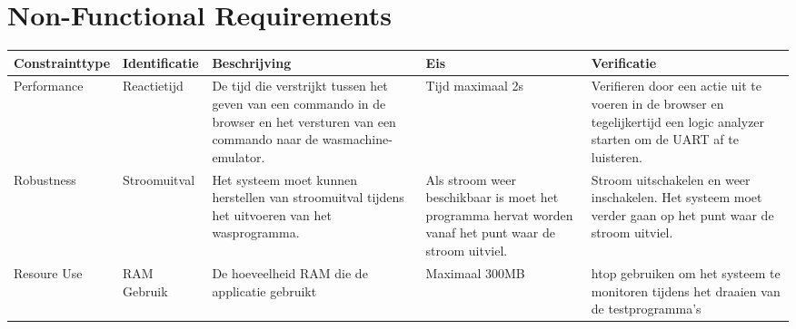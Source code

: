 \chapter{Non-Functional Requirements}
\begin{center}
\begin{tabular}{ | p{3cm} | p{2.5cm} | p{2.5cm} | p{2cm} | p{3cm} | }
\hline
\textbf{Constrainttype} & \textbf{Identificatie} & \textbf{Beschrijving} & \textbf{Eis} & \textbf{Verificatie} \\
\hline
Performance & Reactietijd & De tijd die verstrijkt tussen het geven van een commando in de browser en het versturen van een commando naar de wasmachine-emulator. & Tijd maximaal 2s & Verifieren door een actie uit te voeren in de browser en tegelijkertijd een logic analyzer starten om de UART af te luisteren. \\ \hline

Robustness & Stroomuitval & Het systeem moet kunnen herstellen van stroomuitval tijdens het uitvoeren van het wasprogramma. & Als stroom weer beschikbaar is moet het programma hervat worden vanaf het punt waar de stroom uitviel. & Stroom uitschakelen en weer inschakelen. Het systeem moet verder gaan op het punt waar de stroom uitviel. \\ \hline

Resoure Use & RAM Gebruik & De hoeveelheid RAM die de applicatie gebruikt & Maximaal 300MB & htop gebruiken om het systeem te monitoren tijdens het draaien van de testprogramma's \\ \hline
\end{tabular}

\end{center}
